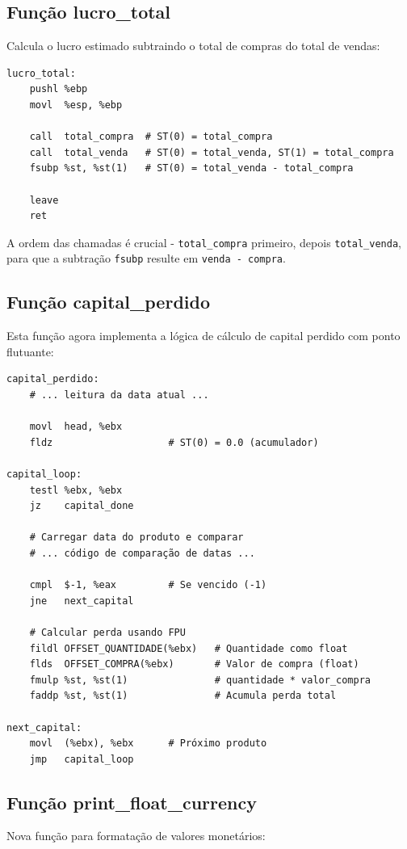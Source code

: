\documentclass[12pt]{article}
\begin{document}
\subsection{Função lucro\_total}
Calcula o lucro estimado subtraindo o total de compras do total de vendas:

\begin{verbatim}
lucro_total:
    pushl %ebp
    movl  %esp, %ebp
    
    call  total_compra  # ST(0) = total_compra
    call  total_venda   # ST(0) = total_venda, ST(1) = total_compra
    fsubp %st, %st(1)   # ST(0) = total_venda - total_compra
    
    leave
    ret
\end{verbatim}

A ordem das chamadas é crucial - \texttt{total\_compra} primeiro, depois \texttt{total\_venda}, para que a subtração \texttt{fsubp} resulte em \texttt{venda - compra}.

\subsection{Função capital\_perdido}
Esta função agora implementa a lógica de cálculo de capital perdido com ponto flutuante:

\begin{verbatim}
capital_perdido:
    # ... leitura da data atual ...
    
    movl  head, %ebx
    fldz                    # ST(0) = 0.0 (acumulador)

capital_loop:
    testl %ebx, %ebx
    jz    capital_done
    
    # Carregar data do produto e comparar
    # ... código de comparação de datas ...
    
    cmpl  $-1, %eax         # Se vencido (-1)
    jne   next_capital
    
    # Calcular perda usando FPU
    fildl OFFSET_QUANTIDADE(%ebx)   # Quantidade como float
    flds  OFFSET_COMPRA(%ebx)       # Valor de compra (float)
    fmulp %st, %st(1)               # quantidade * valor_compra
    faddp %st, %st(1)               # Acumula perda total

next_capital:
    movl  (%ebx), %ebx      # Próximo produto
    jmp   capital_loop
\end{verbatim}

\subsection{Função print\_float\_currency}
Nova função para formatação de valores monetários:
\end{document}
